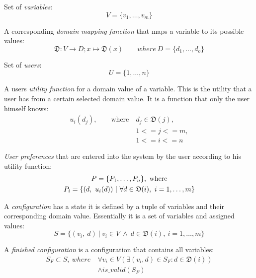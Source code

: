 \documentclass{article}
\begin{document}
Set of \emph{variables}:
\begin{equation}
    V = \{v_1, \dotsc, v_m\}
\end{equation}

A corresponding \emph{domain mapping function} that maps a variable to its possible values:
\begin{equation}
    \mathfrak{D} : V \to D; x \mapsto \mathfrak{D}(x) \qquad where \ D = \{d_1, \dotsc, d_o\}
\end{equation}

Set of \emph{users}:
\begin{equation}
    U = \{1, \dotsc, n\}
\end{equation}

A users \emph{utility function} for a domain value of a variable. This is the utility that a user has from a certain selected domain value. It is a function that only the user himself knows:
\begin{equation}
    \begin{split}
        u_i(d_j), \qquad \text{where}\ & d_j \in  \mathfrak{D}(j),\\
        & 1 <= j <= m, \\
        & 1 <= i <= n
    \end{split}
\end{equation}

\emph{User preferences} that are entered into the system by the user according to his utility function:
\begin{gather}
    P = \{ P_1, \dotsc, P_n\},\ \text{where} \\
    P_i = \{(d,\ u_i(d)) \ | \ \forall d \in \mathfrak{D}(i),\ i=1,\dotsc,m \} \notag
\end{gather}

A \emph{configuration} has a state it is defined by a tuple of variables and their corresponding domain value. Essentially it is a set of variables and assigned values:
\begin{equation}
    S = \{ (v_i,\ d) \ |\ v_i \in V \ \land \ d \in \mathfrak{D}(i),\ i=1,\dotsc,m \}
\end{equation}

A \emph{finished configuration} is a configuration that contains all variables:
\begin{equation}
\begin{split}
    S_F \subset S,\ where \  & \forall v_i \in V (\exists (v_i, d) \in S_F : d \in \mathfrak{D}(i)) \\
    & \land is\_valid(S_F)
\end{split}
\end{equation}
\end{document}
